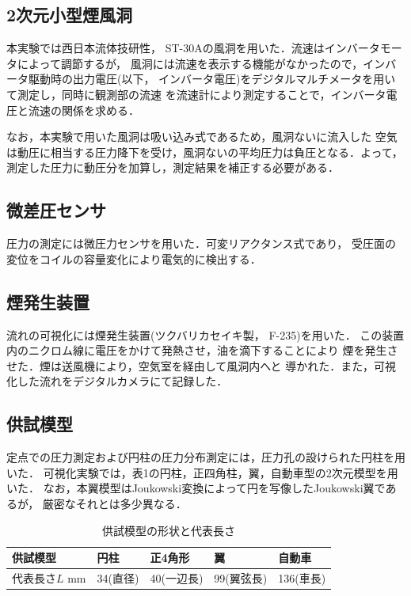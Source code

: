 \documentclass[twocolumn,10pt,a4j]{jsarticle}
\begin{document}
  \subsection{2次元小型煙風洞}
        本実験では西日本流体技研性， ST-30Aの風洞を用いた．流速はインバータモータによって調節するが，
        風洞には流速を表示する機能がなかったので，インバータ駆動時の出力電圧(以下，
        インバータ電圧)をデジタルマルチメータを用いて測定し，同時に観測部の流速
        を流速計により測定することで，インバータ電圧と流速の関係を求める．
        \par なお，本実験で用いた風洞は吸い込み式であるため，風洞ないに流入した
        空気は動圧に相当する圧力降下を受け，風洞ないの平均圧力は負圧となる．よって，
        測定した圧力に動圧分を加算し，測定結果を補正する必要がある．
  \subsection{微差圧センサ}
        圧力の測定には微圧力センサを用いた．可変リアクタンス式であり，
        受圧面の変位をコイルの容量変化により電気的に検出する．
  \subsection{煙発生装置}
        流れの可視化には煙発生装置(ツクバリカセイキ製， F-235)を用いた．
        この装置内のニクロム線に電圧をかけて発熱させ，油を滴下することにより
        煙を発生させた．煙は送風機により，空気室を経由して風洞内へと
        導かれた．また，可視化した流れをデジタルカメラにて記録した．
  \subsection{供試模型}
        定点での圧力測定および円柱の圧力分布測定には，圧力孔の設けられた円柱を用いた．
        可視化実験では，表1の円柱，正四角柱，翼，自動車型の2次元模型を用いた．
        なお，本翼模型はJoukowski変換によって円を写像したJoukowski翼であるが，
        厳密なそれとは多少異なる．
        \begin{table}[]
          \centering
            \caption{供試模型の形状と代表長さ}
            \label{my-label}
            \footnotesize
            \begin{tabular}{lllll}
              供試模型 &     円柱 & 正4角形 & 翼 & 自動車 \\ \hline
              代表長さ$L$ mm& 34(直径) & 40(一辺長)  & 99(翼弦長) & 136(車長) \\
            \end{tabular}
          \end{table}
\end{document}
